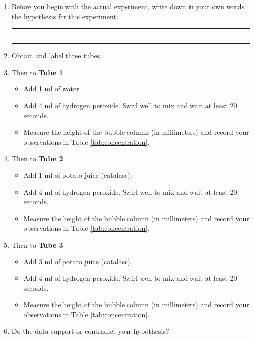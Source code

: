 \begin{enumerate}
\def\labelenumi{\arabic{enumi}.}
\item
  Before you begin with the actual experiment, write down in your own
  words the hypothesis for this experiment:

  \begin{center}\rule{0.5\linewidth}{\linethickness}\end{center}

  \begin{center}\rule{0.5\linewidth}{\linethickness}\end{center}

  \begin{center}\rule{0.5\linewidth}{\linethickness}\end{center}
\item
  Obtain and label three tubes.
\item
  Then to \textbf{Tube 1}

  \begin{itemize}
  \tightlist
  \item
    Add 1 ml of water.
  \item
    Add 4 ml of hydrogen peroxide. Swirl well to mix and wait at least
    20 seconds.
  \item
    Measure the height of the bubble column (in millimeters) and record
    your observations in Table \ref{tab:concentration}.
  \end{itemize}
\item
  Then to \textbf{Tube 2}

  \begin{itemize}
  \tightlist
  \item
    Add 1 ml of potato juice (catalase).
  \item
    Add 4 ml of hydrogen peroxide. Swirl well to mix and wait at least
    20 seconds.
  \item
    Measure the height of the bubble column (in millimeters) and record
    your observations in Table \ref{tab:concentration}.
  \end{itemize}
\item
  Then to \textbf{Tube 3}

  \begin{itemize}
  \tightlist
  \item
    Add 3 ml of potato juice (catalase).
  \item
    Add 4 ml of hydrogen peroxide. Swirl well to mix and wait at least
    20 seconds.
  \item
    Measure the height of the bubble column (in millimeters) and record
    your observations in Table \ref{tab:concentration}.
  \end{itemize}
\item
  Do the data support or contradict your hypothesis?
\end{enumerate}


